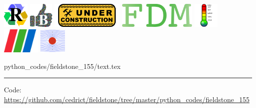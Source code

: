 \noindent
\includegraphics[height=1.25cm]{images/pictograms/replication}
\includegraphics[height=1.25cm]{images/pictograms/benchmark}
\includegraphics[height=1.25cm]{images/pictograms/under_construction}
\includegraphics[height=1.25cm]{images/pictograms/FDM}
\includegraphics[height=1.25cm]{images/pictograms/temperature}
\includegraphics[height=1.25cm]{images/pictograms/paraview}
\includegraphics[height=1.25cm]{images/pictograms/streamfunction}



\begin{flushright} {\tiny {\color{gray} python\_codes/fieldstone\_155/text.tex}} \end{flushright}

%

\par\noindent\rule{\textwidth}{0.4pt}

\begin{center}
\inpython
{\small Code: \url{https://github.com/cedrict/fieldstone/tree/master/python_codes/fieldstone_155}}
\end{center}

